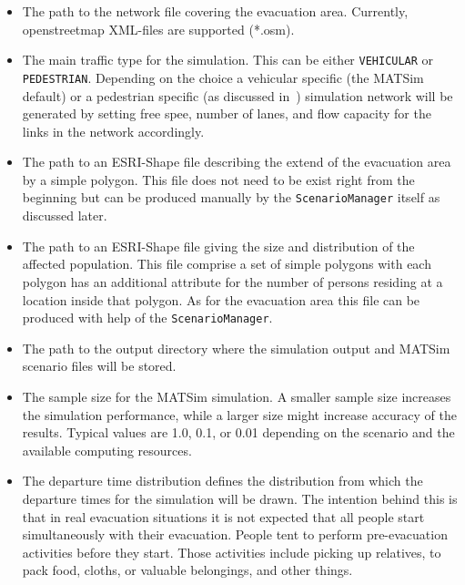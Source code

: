 \begin{itemize}
\item The path to the network file covering the evacuation area. Currently, openstreetmap XML-files are supported (*.osm).
\item The main traffic type for the simulation. This can be either \verb+VEHICULAR+ or \verb+PEDESTRIAN+. Depending on the choice a vehicular specific (the MATSim default) or a pedestrian specific (as discussed in~\citet{LaemmelKluepfelNagel2009EvacPadangAtBookTimmermanns,Laemmel_PhDThesis_2011}) simulation network will be generated by setting free spee, number of lanes, and flow capacity for the links in the network accordingly.
\item The path to an ESRI-Shape file describing the extend of the evacuation area by a simple polygon. This file does not need to be exist right from the beginning but can be produced manually by the \verb+ScenarioManager+ itself as discussed later.
\item The path to an ESRI-Shape file giving the size and distribution of the affected population. This file comprise a set of simple polygons with each polygon has an additional attribute for the number of persons residing at a location inside that polygon. As for the evacuation area this file can be produced with help of the  \verb+ScenarioManager+.
\item The path to the output directory where the simulation output and MATSim scenario files will be stored.
\item The sample size for the MATSim simulation. A smaller sample size increases the simulation performance, while a larger size might increase accuracy of the results. Typical values are 1.0, 0.1, or 0.01 depending on the scenario and the available computing resources.
\item The departure time distribution defines the distribution from which the departure times for the simulation will be drawn. The intention behind this is that in real evacuation situations it is not expected that all people start simultaneously with their evacuation. 
People tent to perform pre-evacuation activities before they start. Those activities include picking up relatives, to pack food, cloths, or valuable belongings, and other things. 

\end{itemize}
